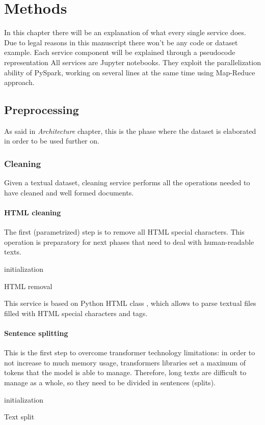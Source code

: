 \documentclass[\main/main.tex]{subfiles}
\begin{document}
\chapter{Methods}
\label{methods}
In this chapter there will be an explanation of what every single service does. Due to legal reasons in this manuscript there won't be any code or dataset example. Each service component will be explained through a pseudocode representation
All services are Jupyter notebooks. They exploit the parallelization ability of PySpark, working on several lines at the same time using Map-Reduce approach.
\section{Preprocessing}
As said in \textit{Architecture} chapter, this is the phase where the dataset is elaborated in order to be used further on. 
\subsection{Cleaning}
Given a textual dataset, cleaning service performs all the operations needed to have cleaned and well formed documents.
\subsubsection{HTML cleaning}
The first (parametrized) step is to remove all HTML special characters. This operation is preparatory for next phases that need to deal with human-readable texts.
\begin{center}
    \begin{algorithm}[H]
     initialization
     \caption{HTML removal}
    \end{algorithm}
\end{center}
This service is based on Python HTML class \cite{html_parser}, which allows to parse textual files filled with HTML special characters and tags.
\subsubsection{Sentence splitting}
This is the first step to overcome transformer technology limitations: in order to not increase to much memory usage, transformers libraries set a maximum of tokens that the model is able to manage. Therefore, long texts are difficult to manage as a whole, so they need to be divided in sentences (splits).
\begin{center}
    \begin{algorithm}[H]
     initialization
     \caption{Text split}
    \end{algorithm}
\end{center}
\end{document}
